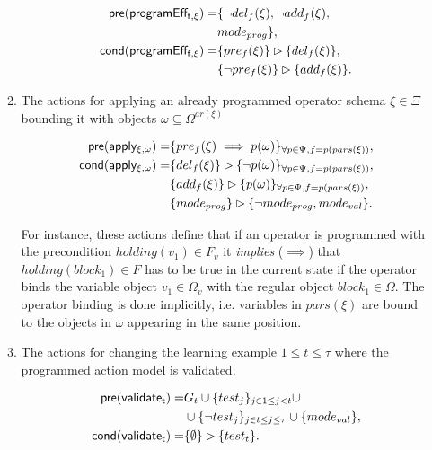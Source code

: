 \documentclass[letterpaper]{article} %
\newcommand{\pre}{\mathsf{pre}}     %
\newcommand{\cond}{\mathsf{cond}}   %
\begin{document}
\begin{itemize}
\begin{enumerate}
\begin{small}
\begin{align*}
\hspace*{7pt}\pre(\mathsf{programEff_{f,\xi}})=&\{\neg del_{f}(\xi),\neg add_{f}(\xi),\\                                                   
& mode_{prog}\},\\ 
\cond(\mathsf{programEff_{f,\xi}})=&\{pre_{f}(\xi)\}\rhd\{del_{f}(\xi)\},\\
&\{\neg pre_{f}(\xi)\}\rhd\{add_{f}(\xi)\}.
\end{align*}
\end{small}

\item The actions for applying an already programmed operator schema $\xi\in\Xi$ bounding it with objects $\omega\subseteq\Omega^{ar(\xi)}$
\begin{small}
\begin{align*}
\hspace*{7pt}\pre(\mathsf{apply_{\xi,\omega}})=&\{pre_{f}(\xi)\implies p(\omega)\}_{\forall p\in\Psi,f=p(pars(\xi))},\\
\cond(\mathsf{apply_{\xi,\omega}})=&\{del_{f}(\xi)\}\rhd\{\neg p(\omega)\}_{\forall p\in\Psi,f=p(pars(\xi))},\\
&\{add_{f}(\xi)\}\rhd\{p(\omega)\}_{\forall p\in\Psi,f=p(pars(\xi))},\\
&\{mode_{prog}\}\rhd\{\neg mode_{prog},mode_{val}\}.
\end{align*}
\end{small}

For instance, these actions define that if an operator is programmed with the precondition $holding(v_1)\in F_v$ it {\em implies} ($\implies$) that $holding(block_1)\in F$ has to be true in the current state if the operator binds the variable object $v_1\in\Omega_v$ with the regular object $block_1\in\Omega$. The operator binding is done implicitly, i.e. variables in $pars(\xi)$ are bound to the objects in $\omega$ appearing in the same position. 

\item The actions for changing the learning example {\small $1\leq t\leq \tau$} where the programmed action model is validated. 
\begin{small}
\begin{align*}
\hspace*{7pt}\pre(\mathsf{validate_{t}})=&G_t\cup\{test_j\}_{j\in 1\leq j<t}\cup\\
&\cup\{\neg test_j\}_{j\in t\leq j\leq \tau}\cup \{mode_{val}\},\\
\cond(\mathsf{validate_{t}})=&\{\emptyset\}\rhd\{test_t\}.
\end{align*}
\end{small}
\end{enumerate}
\end{itemize}
\end{document}
